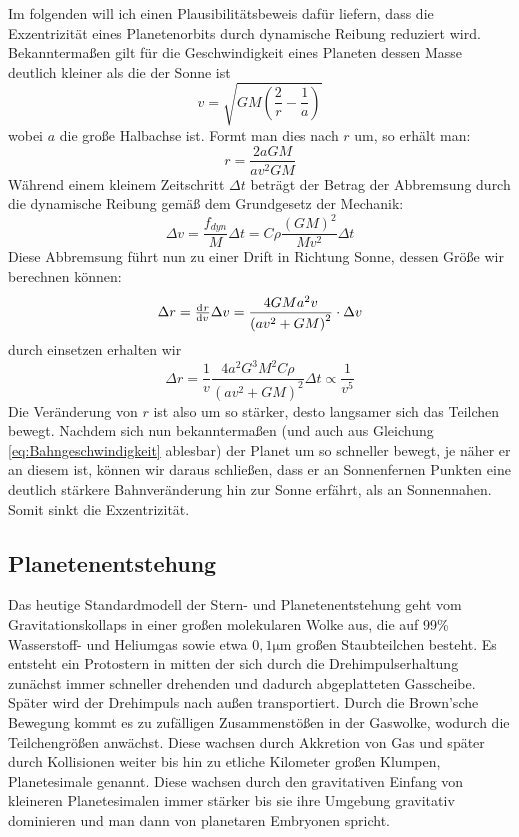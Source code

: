 \documentclass[12pt,a4paper,twoside]{article}
\renewcommand{\cite}{\citep}
\begin{document}
Im folgenden will ich einen Plausibilitätsbeweis dafür liefern, dass die Exzentrizität eines Planetenorbits durch dynamische Reibung reduziert wird.
Bekanntermaßen gilt für die Geschwindigkeit eines Planeten dessen Masse deutlich kleiner als die der Sonne ist
\begin{equation}\label{eq:Bahngeschwindigkeit}
v= \sqrt{GM\left(\frac{2}{r}-\frac{1}{a}\right)}
\end{equation}
wobei $a$ die große Halbachse ist. Formt man dies nach $r$ um, so erhält man:
\begin{equation}
r = \frac{2aGM}{av^2GM}
\end{equation}
Während einem kleinem Zeitschritt $\Delta t$ beträgt der Betrag der Abbremsung durch die dynamische Reibung gemäß dem Grundgesetz der Mechanik:
\begin{equation}
\Delta v = \frac{f_{dyn}}{M} \Delta t = C \rho \frac{\left(GM\right)^2}{Mv^2} \Delta t
\end{equation}
Diese Abbremsung führt nun zu einer Drift in Richtung Sonne, dessen Größe wir berechnen können:
\begin{equation}
\Delta r = \od{r}{v}\Delta v = \frac{4GMa^2v}{\left(av^2+GM\right)^2} \cdot \Delta v
\end{equation}
durch einsetzen erhalten wir
\begin{equation}
\Delta r = \frac{1}{v} \frac{4a^2G^3M^2 C \rho}{\left(av^2+GM\right)^2}  \Delta t \propto \frac{1}{v^5}
\end{equation} %
Die Veränderung von $r$ ist also um so stärker, desto langsamer sich das Teilchen bewegt. Nachdem sich nun bekanntermaßen (und auch aus Gleichung \ref{eq:Bahngeschwindigkeit} ablesbar) der Planet um so schneller bewegt, je näher er an diesem ist, können wir daraus schließen, dass er an Sonnenfernen Punkten eine deutlich stärkere Bahnveränderung hin zur Sonne erfährt, als an Sonnennahen. Somit sinkt die Exzentrizität.

\subsection{Planetenentstehung} %
Das heutige Standardmodell der Stern- und Planetenentstehung geht vom Gravitationskollaps in einer großen molekularen Wolke aus, die auf 99\% Wasserstoff- und Heliumgas sowie etwa $0,1\mathrm{\mu m}$ großen Staubteilchen besteht\cite{Hanslmeier2002}. Es entsteht ein Protostern in mitten der sich durch die Drehimpulserhaltung zunächst immer schneller drehenden und dadurch abgeplatteten Gasscheibe.
Später wird der Drehimpuls nach außen transportiert. %
Durch die Brown'sche Bewegung kommt es zu zufälligen Zusammenstößen in der Gaswolke, wodurch die Teilchengrößen anwächst. Diese wachsen durch Akkretion von Gas und später durch Kollisionen weiter bis hin zu etliche Kilometer großen Klumpen, Planetesimale genannt.
Diese wachsen durch den gravitativen Einfang von kleineren Planetesimalen immer stärker bis sie ihre Umgebung gravitativ dominieren und man dann von planetaren Embryonen spricht.
\end{document}
